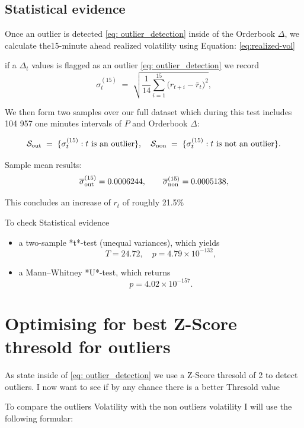 \documentclass[12pt]{article}
\begin{document}
\newpage

\subsection{Statistical evidence}

Once an outlier is detected \eqref{eq: outlier_detection} inside of the Orderbook $\Delta$, we calculate the15-minute ahead realized volatility using Equation: \eqref{eq:realized-vol}




if a $\Delta_t$ values is flagged as an outlier \eqref{eq: outlier_detection}
we record
$$
\sigma^{(15)}_t
\;=\;
\sqrt{\frac{1}{14}\sum_{i=1}^{15}\bigl(r_{t+i}-\bar r_{t}\bigr)^{2}},
$$

We then form two samples over our full dataset which during this test includes 104 957 one minutes intervals of $P$ and Orderbook $\Delta$:


$$
\mathcal{S}_{\rm out} \;=\;\{\sigma^{(15)}_t : t\text{ is an outlier}\},
\quad
\mathcal{S}_{\rm non} \;=\;\{\sigma^{(15)}_t : t\text{ is not an outlier}\}.
$$


Sample mean results:
$$
\overline{\sigma}^{(15)}_{\rm out}
=0.0006244,
\qquad
\overline{\sigma}^{(15)}_{\rm non}
=0.0005138,
$$




This concludes an increase of $r_t$ of roughly 21.5\%


To check Statistical evidence

\begin{itemize}
  \item a two-sample *t*-test (unequal variances), which yields
  $$
    T=24.72,\quad p=4.79\times10^{-132},
  $$
  \item a Mann–Whitney *U*-test, which returns
  $$
    p=4.02\times10^{-157}.
  $$
\end{itemize}


\newpage

\section{Optimising for best Z-Score thresold for outliers}

As state inside of \eqref{eq: outlier_detection} we use a Z-Score thresold of 2 to detect outliers. I now want to 
see if by any chance there is a better Thresold value  

To compare the outliers Volatility with the non outliers volatility I will use the following formular:
\end{document}
